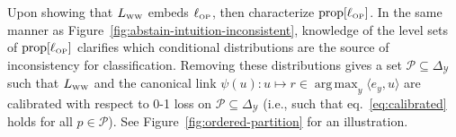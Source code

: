 \documentclass[twoside,11pt]{article}
\newcommand{\Comments}{1}
\newcommand{\mynote}[2]{\ifnum\Comments=1\textcolor{#1}{#2}\fi}
\newcommand{\jessie}[1]{\mynote{teal}{[JF: #1]}}
\newcommand{\prop}[1]{\mathrm{prop}[#1]}
\newcommand{\LWW}{L_{\text{\tiny WW}}}
\newcommand{\ellOP}{\ell_{\text{\tiny OP}}}
\newcommand{\mode}{\mathrm{mode}}
\newcommand{\simplex}{\Delta_\Y}
\renewcommand{\P}{\mathcal{P}}
\newcommand{\T}{\mathcal{T}}
\newcommand{\Y}{\mathcal{Y}}
\newcommand{\inprod}[2]{\langle #1, #2 \rangle}%
\DeclareMathOperator*{\argmax}{arg\,max}
\begin{document}
Upon showing that $\LWW$ embeds $\ellOP$, \citeauthor{wang2020weston} then characterize $\prop{\ellOP}$.
In the same manner as Figure~\ref{fig:abstain-intuition-inconsistent}, knowledge of the level sets of $\prop{\ellOP}$ clarifies which conditional distributions are the source of inconsistency for classification.
Removing these distributions gives a set $\P \subseteq \simplex$
such that $\LWW$ and the canonical link $\psi(u) : u \mapsto r \in \argmax_y \inprod{e_y}{u}$ are calibrated with respect to 0-1 loss on $\P \subseteq \simplex$ (i.e., such that eq.~\eqref{eq:calibrated} holds for all $p \in \P$).
See Figure~\ref{fig:ordered-partition} for an illustration.
\end{document}
